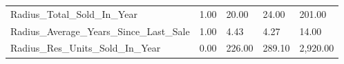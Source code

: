 \documentclass[]{article}
\begin{document}
\begin{longtable}[]{@{}lllll@{}}
\midrule
\endhead
\begin{minipage}[t]{0.49\columnwidth}\raggedright\strut
Radius\_Total\_Sold\_In\_Year\strut
\end{minipage} & \begin{minipage}[t]{0.08\columnwidth}\raggedright\strut
1.00\strut
\end{minipage} & \begin{minipage}[t]{0.09\columnwidth}\raggedright\strut
20.00\strut
\end{minipage} & \begin{minipage}[t]{0.09\columnwidth}\raggedright\strut
24.00\strut
\end{minipage} & \begin{minipage}[t]{0.11\columnwidth}\raggedright\strut
201.00\strut
\end{minipage}\tabularnewline
\begin{minipage}[t]{0.49\columnwidth}\raggedright\strut
Radius\_Average\_Years\_Since\_Last\_Sale\strut
\end{minipage} & \begin{minipage}[t]{0.08\columnwidth}\raggedright\strut
1.00\strut
\end{minipage} & \begin{minipage}[t]{0.09\columnwidth}\raggedright\strut
4.43\strut
\end{minipage} & \begin{minipage}[t]{0.09\columnwidth}\raggedright\strut
4.27\strut
\end{minipage} & \begin{minipage}[t]{0.11\columnwidth}\raggedright\strut
14.00\strut
\end{minipage}\tabularnewline
\begin{minipage}[t]{0.49\columnwidth}\raggedright\strut
Radius\_Res\_Units\_Sold\_In\_Year\strut
\end{minipage} & \begin{minipage}[t]{0.08\columnwidth}\raggedright\strut
0.00\strut
\end{minipage} & \begin{minipage}[t]{0.09\columnwidth}\raggedright\strut
226.00\strut
\end{minipage} & \begin{minipage}[t]{0.09\columnwidth}\raggedright\strut
289.10\strut
\end{minipage} & \begin{minipage}[t]{0.11\columnwidth}\raggedright\strut
2,920.00\strut
\end{minipage}\tabularnewline

\end{longtable}
\end{document}
